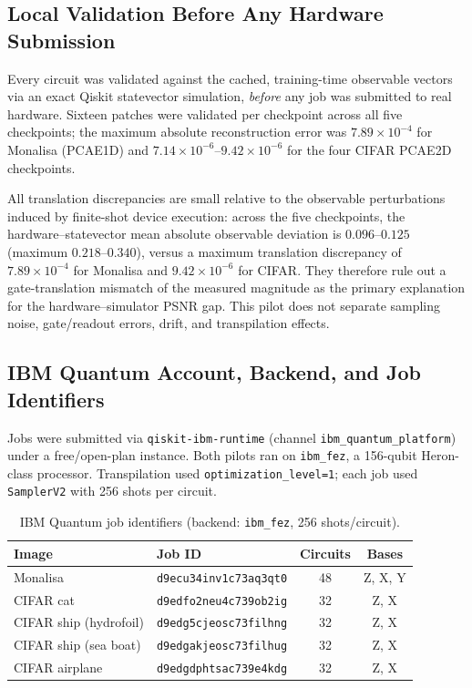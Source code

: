 \documentclass[11pt]{article}
\begin{document}
\subsection{Local Validation Before Any Hardware Submission}
Every circuit was validated against the cached, training-time observable vectors via an exact Qiskit statevector simulation, \emph{before} any job was submitted to real hardware. Sixteen patches were validated per checkpoint across all five checkpoints; the maximum absolute reconstruction error was $7.89\times10^{-4}$ for Monalisa (PCAE1D) and $7.14\times10^{-6}$--$9.42\times10^{-6}$ for the four CIFAR PCAE2D checkpoints.

All translation discrepancies are small relative to the observable perturbations induced by finite-shot device execution: across the five checkpoints, the hardware--statevector mean absolute observable deviation is $0.096$--$0.125$ (maximum $0.218$--$0.340$), versus a maximum translation discrepancy of $7.89\times10^{-4}$ for Monalisa and $9.42\times10^{-6}$ for CIFAR. They therefore rule out a gate-translation mismatch of the measured magnitude as the primary explanation for the hardware--simulator PSNR gap. This pilot does not separate sampling noise, gate/readout errors, drift, and transpilation effects.

\subsection{IBM Quantum Account, Backend, and Job Identifiers}
Jobs were submitted via \texttt{qiskit-ibm-runtime} (channel \texttt{ibm\_quantum\_platform}) under a free/open-plan instance. Both pilots ran on \texttt{ibm\_fez}, a 156-qubit Heron-class processor. Transpilation used \texttt{optimization\_level=1}; each job used \texttt{SamplerV2} with 256 shots per circuit.

\begin{table}[H]
\centering
\caption{IBM Quantum job identifiers (backend: \texttt{ibm\_fez}, 256 shots/circuit).}
\scriptsize
\begin{tabular}{llcc}
\toprule
Image & Job ID & Circuits & Bases \\
\midrule
Monalisa & \texttt{d9ecu34inv1c73aq3qt0} & 48 & Z, X, Y \\
CIFAR cat & \texttt{d9edfo2neu4c739ob2ig} & 32 & Z, X \\
CIFAR ship (hydrofoil) & \texttt{d9edg5cjeosc73filhng} & 32 & Z, X \\
CIFAR ship (sea boat) & \texttt{d9edgakjeosc73filhug} & 32 & Z, X \\
CIFAR airplane & \texttt{d9edgdphtsac739e4kdg} & 32 & Z, X \\
\bottomrule
\end{tabular}
\end{table}
\end{document}
